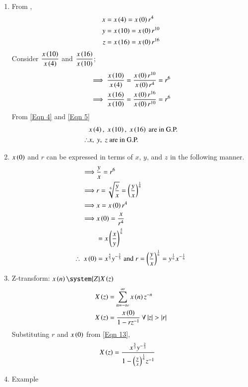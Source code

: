 \documentclass[journal,12pt,twocolumn]{IEEEtran}
\theoremstyle{remark}
\begin{document}
\begin{enumerate}
\item From ,
\begin{align}
    x&= x\left(4\right) =x\left(0\right)r^4 \\
 y&=x\left(10\right)=x\left(0\right)r^{10} \\
 z&=x\left(16\right)=x\left(0\right)r^{16}
\end{align}
Consider $\dfrac{x\left(10\right)}{x\left(4\right)}$ and $\dfrac{x\left(16\right)}{x\left(10\right)}$;
\begin{align}
 \implies\dfrac{x\left(10\right)}{x\left(4\right)} &= \dfrac{x\left(0\right)r^{10}}{x\left(0\right)r^4} = r^6 \label{Eqn 4}\\ 
 \implies\dfrac{x\left(16\right)}{x\left(10\right)} &= \dfrac{x\left(0\right)r^{16}}{x\left(0\right)r^{10}} = r^6\label{Eqn 5}
\end{align}
From \eqref{Eqn 4} and \eqref{Eqn 5}
\begin{align}  
   & x\left(4\right),\; x\left(10\right),\; x\left(16\right)\text{ are in G.P.} \\
\notag  \therefore & x,\; y,\; z \text{ are in G.P.}
\end{align}
\item
$x\left(0\right)$ and $r$ can be expressed in terms of $x$, $y$, and $z$ in the following manner.
\begin{align}
    \implies&\frac{y}{x}=r^6 \\
 \implies& r=\sqrt[6]{\frac{y}{x}}=\left(\frac{y}{x}\right)^{\frac{1}{6}}\\
    \implies&  x=x\left(0\right)r^4 \\
    \implies& x\left(0\right)=\frac{x}{r^4}\\
    &=x\left(\frac{x}{y}\right)^{\frac{4}{6}}\\
 \therefore\; x\left(0\right)&=x^{\frac{5}{3}}y^{-\frac{2}{3}}\;
 \text{and}\; r=\left(\frac{y}{x}\right)^{\frac{1}{6}}= y^{\frac{1}{6}}x^{-\frac{1}{6}} \label{Eqn 13}
\end{align}
\item 
Z-transform:    $x\brak{n} \system{Z} X\brak{z}$
\begin{align}
    X\brak{z}&= \sum_{n=-\infty}^{\infty} x\brak{n}z^{-n}\\
    X\brak{z}&=\dfrac{x\brak{0}}{1-rz^{-1}}\: \forall\: |z|>|r|
\end{align}
Substituting $r$ and $x\left(0\right)$ from \eqref{Eqn 13}, 
\begin{align}
     X\left(z\right)&=\dfrac{x^{\frac{5}{3}}y^{-\frac{2}{3}}}{1-{\left(\frac{y}{x}\right)^{\frac{1}{6}}}z^{-1}}
\end{align}
\item Example 

\end{enumerate}
\end{document}
